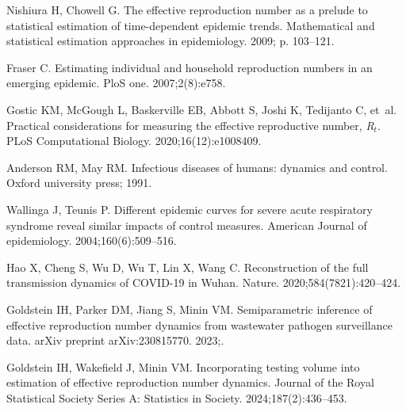 \documentclass[10pt,letterpaper]{article}
\begin{document}
%
%
%
\begin{thebibliography}{10}

  Nishiura H, Chowell G.
  \newblock The effective reproduction number as a prelude to statistical
    estimation of time-dependent epidemic trends.
  \newblock Mathematical and statistical estimation approaches in epidemiology.
    2009; p. 103--121.
  
  Fraser C.
  \newblock Estimating individual and household reproduction numbers in an
    emerging epidemic.
  \newblock PloS one. 2007;2(8):e758.
  
  Gostic KM, McGough L, Baskerville EB, Abbott S, Joshi K, Tedijanto C, et~al.
  \newblock Practical considerations for measuring the effective reproductive
    number, \emph{R}$_t$.
  \newblock PLoS Computational Biology. 2020;16(12):e1008409.
  
  Anderson RM, May RM.
  \newblock Infectious diseases of humans: dynamics and control.
  \newblock Oxford university press; 1991.
  
  Wallinga J, Teunis P.
  \newblock Different epidemic curves for severe acute respiratory syndrome
    reveal similar impacts of control measures.
  \newblock American Journal of epidemiology. 2004;160(6):509--516.
  
  Hao X, Cheng S, Wu D, Wu T, Lin X, Wang C.
  \newblock Reconstruction of the full transmission dynamics of COVID-19 in
    Wuhan.
  \newblock Nature. 2020;584(7821):420--424.
  
  Goldstein IH, Parker DM, Jiang S, Minin VM.
  \newblock Semiparametric inference of effective reproduction number dynamics
    from wastewater pathogen surveillance data.
  \newblock arXiv preprint arXiv:230815770. 2023;.
  
  Goldstein IH, Wakefield J, Minin VM.
  \newblock Incorporating testing volume into estimation of effective
    reproduction number dynamics.
  \newblock Journal of the Royal Statistical Society Series A: Statistics in
    Society. 2024;187(2):436--453.
  

\end{thebibliography}
\end{document}
